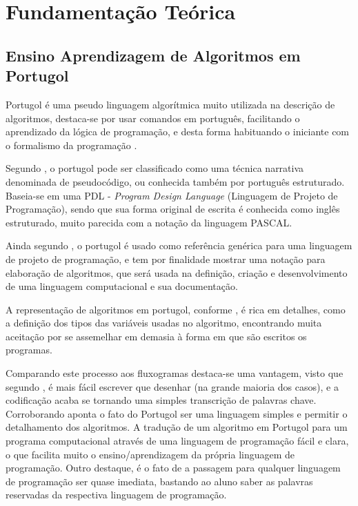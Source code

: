 
\chapter{Fundamentação Teórica}

\section{Ensino Aprendizagem de Algoritmos em Portugol}

Portugol é uma pseudo linguagem algorítmica muito utilizada na descrição de
algoritmos, destaca-se por usar comandos em português, facilitando o aprendizado
da lógica de programação, e desta forma habituando o iniciante com o formalismo
da programação \cite{118}.

Segundo , o portugol pode ser classificado como
uma técnica narrativa denominada de pseudocódigo, ou conhecida também por
português estruturado. Baseia-se em uma PDL - \textit{Program Design Language}
(Linguagem de Projeto de Programação), sendo que sua forma original de escrita é
conhecida como inglês estruturado, muito parecida com a notação da linguagem
PASCAL.

Ainda segundo , o portugol é usado como
referência genérica para uma linguagem de projeto de programação, e tem por
finalidade mostrar uma notação para elaboração de algoritmos, que será usada na
definição, criação e desenvolvimento de uma linguagem computacional e sua
documentação.

A representação de algoritmos em portugol, conforme , é rica em
detalhes, como a definição dos tipos das variáveis usadas no algoritmo,
encontrando muita aceitação por se assemelhar em demasia à forma em que são
escritos os programas.

Comparando este processo aos fluxogramas destaca-se uma vantagem, visto que
segundo , é mais fácil escrever que desenhar
(na grande maioria dos casos), e a codificação acaba se tornando uma simples
transcrição de palavras chave. Corroborando  aponta o fato do
Portugol ser uma linguagem simples e permitir o detalhamento dos algoritmos.
A tradução de um algoritmo em Portugol para um programa computacional através
de uma linguagem de programação fácil e clara, o que facilita muito o
ensino/aprendizagem da própria linguagem de programação. Outro destaque, é o
fato de a passagem para qualquer linguagem de programação ser quase imediata,
bastando ao aluno saber as palavras reservadas da respectiva linguagem de
programação.


